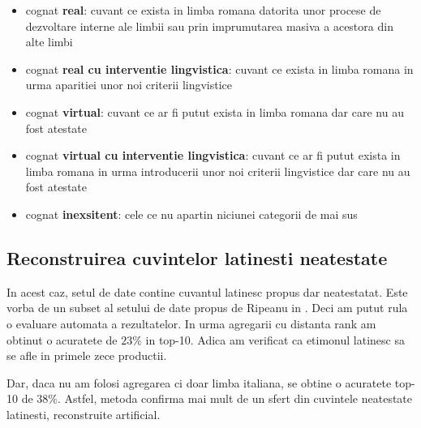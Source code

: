 \begin{itemize}
  \item cognat \textbf{real}: cuvant ce exista in limba romana datorita unor procese de dezvoltare
    interne ale limbii sau prin imprumutarea masiva a acestora din alte limbi
  \item cognat \textbf{real cu interventie lingvistica}: cuvant ce exista in limba romana in urma
    aparitiei unor noi criterii lingvistice
  \item cognat \textbf{virtual}: cuvant ce ar fi putut exista in limba romana dar care nu au fost
    atestate
  \item cognat \textbf{virtual cu interventie lingvistica}: cuvant ce ar fi putut exista in limba
    romana in urma introducerii unor noi criterii lingvistice dar care nu au fost atestate
  \item cognat \textbf{inexsitent}: cele ce nu apartin niciunei categorii de mai sus
\end{itemize}

\subsection{Reconstruirea cuvintelor latinesti neatestate}
In acest caz, setul de date contine cuvantul latinesc propus dar neatestatat. Este vorba de un subset
al setului de date propus de Ripeanu in \cite{ripeanubook}. Deci am putut rula o evaluare automata
a rezultatelor. In urma agregarii cu distanta rank am obtinut o acuratete de $23\%$ in top-10. 
Adica am verificat ca etimonul latinesc sa se afle in primele zece productii.

Dar, daca nu am folosi agregarea ci doar limba italiana, se obtine o acuratete top-10 de $38\%$.
Astfel, metoda confirma mai mult de un sfert din cuvintele neatestate latinesti, reconstruite artificial.
